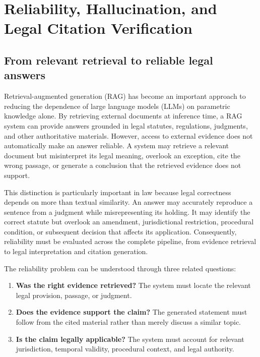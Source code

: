 \section{Reliability, Hallucination, and Legal Citation Verification}
\label{sec:reliability}

\subsection{From relevant retrieval to reliable legal answers}

Retrieval-augmented generation (RAG) has become an important approach to reducing the dependence of
large language models (LLMs) on parametric knowledge alone. By retrieving external documents at
inference time, a RAG system can provide answers grounded in legal statutes, regulations, judgments,
and other authoritative materials. However, access to external evidence does not automatically make an
answer reliable. A system may retrieve a relevant document but misinterpret its legal meaning, overlook
an exception, cite the wrong passage, or generate a conclusion that the retrieved evidence does not
support.

This distinction is particularly important in law because legal correctness depends on more than
textual similarity. An answer may accurately reproduce a sentence from a judgment while misrepresenting
its holding. It may identify the correct statute but overlook an amendment, jurisdictional restriction,
procedural condition, or subsequent decision that affects its application. Consequently, reliability
must be evaluated across the complete pipeline, from evidence retrieval to legal interpretation and
citation generation.

The reliability problem can be understood through three related questions:
\begin{enumerate}[leftmargin=1.4em, itemsep=2pt, topsep=2pt]
\item \textbf{Was the right evidence retrieved?} The system must locate the relevant legal provision,
passage, or judgment.
\item \textbf{Does the evidence support the claim?} The generated statement must follow from the cited
material rather than merely discuss a similar topic.
\item \textbf{Is the claim legally applicable?} The system must account for relevant jurisdiction,
temporal validity, procedural context, and legal authority.
\end{enumerate}

